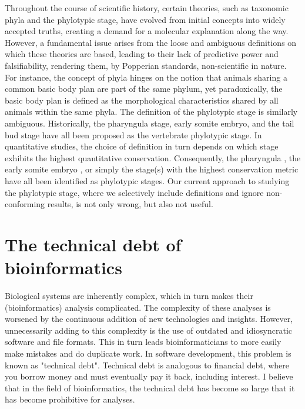 Throughout the course of scientific history, certain theories, such as taxonomic phyla and the phylotypic stage, have evolved from initial concepts into widely accepted truths, creating a demand for a molecular explanation along the way. However, a fundamental issue arises from the loose and ambiguous definitions on which these theories are based, leading to their lack of predictive power and falsifiability, rendering them, by Popperian standards, non-scientific in nature. For instance, the concept of phyla hinges on the notion that animals sharing a common basic body plan are part of the same phylum, yet paradoxically, the basic body plan is defined as the morphological characteristics shared by all animals within the same phyla\cite{BUDD2000,scholtz2004bauplane}. The definition of the phylotypic stage is similarly ambiguous. Historically, the pharyngula stage\cite{BALLARD1981}, early somite embryo\cite{Alberch1993}, and the tail bud stage \cite{Slack1993} have all been proposed as the vertebrate phylotypic stage. In quantitative studies, the choice of definition in turn depends on which stage exhibits the highest quantitative conservation. Consequently, the pharyngula \cite{Irie2011,marletaz2018}, the early somite embryo \cite{DomazetLoso2010}, or simply the stage(s) with the highest conservation metric\cite{Kalinka2010,Cordero2020} have all been identified as phylotypic stages. Our current approach to studying the phylotypic stage, where we selectively include definitions and ignore non-conforming results, is not only wrong, but also not useful.

\section{The technical debt of bioinformatics}

Biological systems are inherently complex, which in turn makes their (bioinformatics) analysis complicated. The complexity of these analyses is worsened by the continuous addition of new technologies and insights. However, unnecessarily adding to this complexity is the use of outdated and idiosyncratic software and file formats. This in turn leads bioinformaticians to more easily make mistakes and do duplicate work. In software development, this problem is known as "technical debt". Technical debt is analogous to financial debt, where you borrow money and must eventually pay it back, including interest. I believe that in the field of bioinformatics, the technical debt has become so large that it has become prohibitive for analyses.

